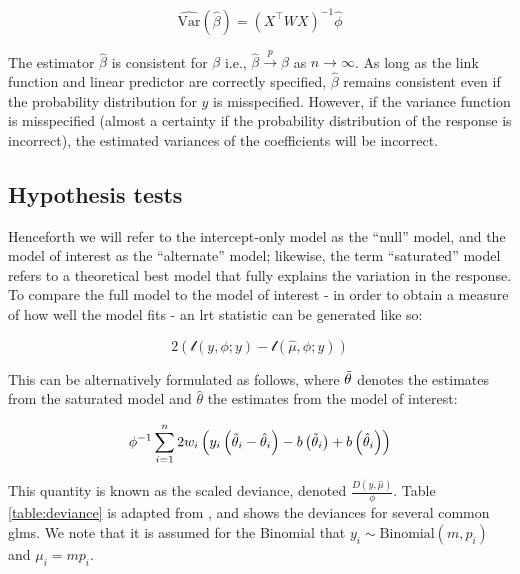 \documentclass{report}
\begin{document}
\begin{equation}\label{eq:glm-beta-variance-est}
    \widehat{\text{Var}}\left(\hat{\beta}\right) = \left(X^\intercal WX\right)^{-1}\hat{\phi}
\end{equation}

The estimator $\hat{\beta}$ is consistent for $\beta$ i.e., $\hat{\beta} \overset{p}{\to} \beta$ as $n \to \infty$. As long as the link function and linear predictor are correctly specified, $\hat{\beta}$ remains consistent even if the probability distribution for $y$ is misspecified. However, if the variance function is misspecified (almost a certainty if the probability distribution of the response is incorrect), the estimated variances of the coefficients will be incorrect. 

\subsection{Hypothesis tests}

Henceforth we will refer to the intercept-only model as the ``null'' model, and the model of interest as the ``alternate'' model; likewise, the term ``saturated'' model refers to a theoretical best model that fully explains the variation in the response. To compare the full model to the model of interest - in order to obtain a measure of how well the model fits - an \gls{lrt} statistic can be generated like so:

\begin{equation}\label{eq:glm-lrt-statistic-1}
    2(\mathcal{l}(y, \phi;y) - \mathcal{l}(\hat{\mu}, \phi;y))
\end{equation}

This can be alternatively formulated as follows, where $\Tilde{\theta}$ denotes the estimates from the saturated model and $\hat{\theta}$ the estimates from the model of interest:

\begin{equation}\label{eq:glm-lrt-statistic-2}
\phi^{-1}\sum_{i=1}^n 2w_i\left(y_i\left(\Tilde{\theta}_i - \hat{\theta}_i\right) - b\left(\Tilde{\theta}_i\right) + b\left(\hat{\theta}_i\right)\right)
\end{equation}

This quantity is known as the scaled deviance, denoted $\frac{D(y, \hat{\mu})}{\phi}$. Table \ref{table:deviance} is adapted from \cite[Chapter~8.3]{faraway_extending_2016}, and shows the deviances for several common \glspl{glm}. We note that it is assumed for the Binomial that $y_i \sim \text{Binomial}(m, p_i)$ and $\mu_i = mp_i$. 
\end{document}
